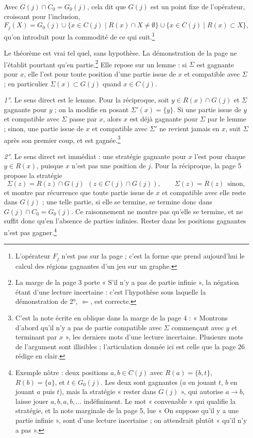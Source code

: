 \documentclass[11pt,a4paper]{article}
\begin{document}
Avec $G(j) \cap C_0 = G_0(j)$, cela dit que $G(j)$ est un point fixe de
l'opérateur, croissant pour l'inclusion,
\[
F_j(X) = G_0(j)
\cup \{x \in C(j) \mid R(x) \cap X \neq \emptyset\}
\cup \{x \in \overline{C}(j) \mid R(x) \subset X\},
\]
qu'on introduit pour la commodité de ce qui suit.\footnote{L'opérateur $F_j$
n'est pas sur la page ; c'est la forme que prend aujourd'hui le calcul des
régions gagnantes d'un jeu sur un graphe.}

Le théorème est vrai tel quel, sans hypothèse. La démonstration de la page ne
l'établit pourtant qu'en partie.\footnote{La marge de la page 3 porte « S'il
n'y a pas de partie infinie », la négation étant d'une lecture incertaine :
c'est l'hypothèse sous laquelle la démonstration de 2°, $\Leftarrow$, est
correcte.} Elle repose sur un lemme : si $\Sigma$ est gagnante pour $x$, elle
l'est pour toute position d'une partie issue de $x$ et compatible avec
$\Sigma$ ; en particulier $\Sigma(x) \subset G(j)$ quand $x \in C(j)$.

\emph{1°.} Le sens direct est le lemme. Pour la réciproque, soit
$y \in R(x) \cap G(j)$ et $\Sigma$ gagnante pour $y$ ; on la modifie en
posant $\Sigma'(x) = \{y\}$. Si une partie issue de $y$ et compatible avec
$\Sigma$ passe par $x$, alors $x$ est déjà gagnante pour $\Sigma$ par le
lemme ; sinon, une partie issue de $x$ et compatible avec $\Sigma'$ ne revient
jamais en $x$, suit $\Sigma$ après son premier coup, et est
gagnée.\footnote{C'est la note écrite en oblique dans la marge de la page 4 :
« Montrons d'abord qu'il n'y a pas de partie compatible avec $\Sigma$
commençant avec $y$ et terminant par $x$ », les derniers mots d'une lecture
incertaine. Plusieurs mots de l'argument sont illisibles ; l'articulation
donnée ici est celle que la page 26 rédige en clair.}

\emph{2°.} Le sens direct est immédiat : une stratégie gagnante pour $x$ l'est
pour chaque $y \in R(x)$, puisque $x$ n'est pas une position de $j$. Pour la
réciproque, la page 5 propose la stratégie
\[
\Sigma(z) = R(z) \cap G(j) \ \ (z \in C(j) \cap G(j)),
\qquad
\Sigma(z) = R(z) \ \ \text{sinon},
\]
et montre par récurrence que toute partie issue de $x$ et compatible avec
elle reste dans $G(j)$ ; une telle partie, si elle se termine, se termine
donc dans $G(j) \cap C_0 = G_0(j)$. Ce raisonnement ne montre pas qu'elle se
termine, et ne suffit donc qu'en l'absence de parties infinies. Rester dans
les positions gagnantes n'est pas gagner.\footnote{Exemple nôtre : deux
positions $a, b \in C(j)$ avec $R(a) = \{b, t\}$, $R(b) = \{a\}$, et
$t \in G_0(j)$. Les deux sont gagnantes ($a$ en jouant $t$, $b$ en jouant
$a$ puis $t$), mais la stratégie « rester dans $G(j)$ », qui autorise
$a \to b$, laisse jouer $a, b, a, b, \ldots$ indéfiniment. Le mot
« convenable » qui qualifie la stratégie, et la note marginale de la page 5,
lue « On suppose qu'il y a une partie infinie », sont d'une lecture
incertaine ; on attendrait plutôt « qu'il n'y a pas ».}
\end{document}

